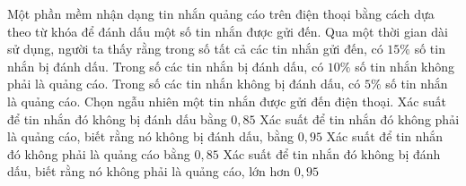 \begin{vd}[BGD-2025]%
    Một phần mềm nhận dạng tin nhắn quảng cáo trên điện thoại bằng cách dựa theo từ khóa để đánh dấu một số tin nhắn được gửi đến. Qua một thời gian dài sử dụng, người ta thấy rằng trong số tất cả các tin nhắn gửi đến, có $15 \%$ số tin nhắn bị đánh dấu. Trong số các tin nhắn bị đánh dấu, có $10 \%$ số tin nhắn không phải là quảng cáo. Trong số các tin nhắn không bị đánh dấu, có $5 \%$ số tin nhắn là quảng cáo.
    Chọn ngẫu nhiên một tin nhắn được gửi đến điện thoại.
    \choiceTF
    {\True Xác suất để tin nhắn đó không bị đánh dấu bằng $0{,}85$}
    {\True Xác suất để tin nhắn đó không phải là quảng cáo, biết rằng nó không bị đánh dấu, bằng $0{,}95$}
    {Xác suất để tin nhắn đó không phải là quảng cáo bằng $0{,}85$}
    {\True Xác suất để tin nhắn đó không bị đánh dấu, biết rằng nó không phải là quảng cáo, lớn hơn $0{,}95$}
\end{vd}
